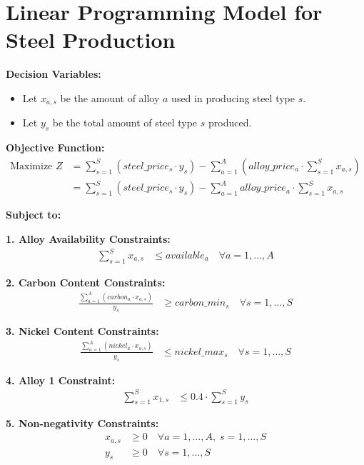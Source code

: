 \documentclass{article}
\begin{document}
\section*{Linear Programming Model for Steel Production}

\textbf{Decision Variables:}
\begin{itemize}
    \item Let $x_{a,s}$ be the amount of alloy $a$ used in producing steel type $s$.
    \item Let $y_s$ be the total amount of steel type $s$ produced.
\end{itemize}

\textbf{Objective Function:}
\begin{align*}
\text{Maximize } Z &= \sum_{s=1}^{S} (steel\_price_s \cdot y_s) - \sum_{a=1}^{A} (alloy\_price_a \cdot \sum_{s=1}^{S} x_{a,s}) \\
&= \sum_{s=1}^{S} (steel\_price_s \cdot y_s) - \sum_{a=1}^{A} alloy\_price_a \cdot \sum_{s=1}^{S} x_{a,s}
\end{align*}

\textbf{Subject to:}

\textbf{1. Alloy Availability Constraints:}
\begin{align*}
\sum_{s=1}^{S} x_{a,s} &\leq available_a \quad \forall a = 1, \ldots, A
\end{align*}

\textbf{2. Carbon Content Constraints:}
\begin{align*}
\frac{\sum_{a=1}^{A} (carbon_a \cdot x_{a,s})}{y_s} &\geq carbon\_min_s \quad \forall s = 1, \ldots, S
\end{align*}

\textbf{3. Nickel Content Constraints:}
\begin{align*}
\frac{\sum_{a=1}^{A} (nickel_a \cdot x_{a,s})}{y_s} &\leq nickel\_max_s \quad \forall s = 1, \ldots, S
\end{align*}

\textbf{4. Alloy 1 Constraint:}
\begin{align*}
\sum_{s=1}^{S} x_{1,s} &\leq 0.4 \cdot \sum_{s=1}^{S} y_s
\end{align*}

\textbf{5. Non-negativity Constraints:}
\begin{align*}
x_{a,s} &\geq 0 \quad \forall a = 1, \ldots, A, \; s = 1, \ldots, S \\
y_s &\geq 0 \quad \forall s = 1, \ldots, S
\end{align*}
\end{document}
